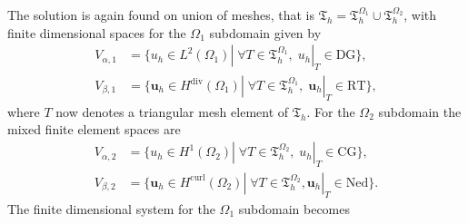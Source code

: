 \documentclass[11pt,a4paper]{article}
\renewcommand{\div}{\operatorname{div}}
\DeclareMathOperator*{\curl}{curl}
\begin{document}
\noindent The solution is again found on union of meshes, that is $\mathfrak{T}_h=\mathfrak{T}_h^{\Omega_1}\cup\mathfrak{T}_h^{\Omega_2}$, with finite dimensional spaces for the $\Omega_1$ subdomain given by
\begin{equation}
    \begin{split}
         V_{\alpha, 1} &= \{u_h\in L^2(\Omega_1)|\; \forall T\in\mathfrak{T}_h^{\Omega_1}, \; u_h|_T\in \mathrm{DG}\}, \\
         V_{\beta, 1} &= \{\bm{u}_h\in H^{\div}(\Omega_1)|\; \forall T\in\mathfrak{T}_h^{\Omega_1}, \; \bm{u}_h|_T\in \mathrm{RT}\}, 
    \end{split}
\end{equation}
where $T$ now denotes a triangular mesh element of $\mathfrak{T}_h$. For the $\Omega_2$ subdomain the mixed finite element spaces are
\begin{equation}
    \begin{split}
        V_{\alpha, 2} &= \{u_h\in H^1(\Omega_2)|\; \forall T\in\mathfrak{T}_h^{\Omega_2},\; u_h|_T\in \mathrm{CG}\}, \\
        V_{\beta, 2} &= \{\bm{u}_h\in H^{\curl}(\Omega_2)|\; \forall T\in\mathfrak{T}_h^{\Omega_2}, \bm{u}_h|_T\in \mathrm{Ned}\}.
    \end{split}
\end{equation}
The finite dimensional system for the $\Omega_1$ subdomain becomes
\end{document}
